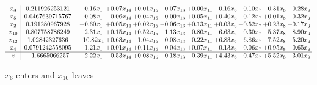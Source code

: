 \documentclass[9pt]{article}
\begin{document}
 \[\begin{array}{c| c c@{\hskip 2pt} c@{\hskip 2pt} c@{\hskip 2pt} c@{\hskip 2pt} c@{\hskip 2pt} c@{\hskip 2pt} c@{\hskip 2pt} c@{\hskip 2pt} c@{\hskip 2pt} }
 x_{3}   &  0.211926253121 & -0.16 x_{1} & +  0.07 x_{14} & +  0.01 x_{15} & +  0.07 x_{13} & +  0.00 x_{11} & -0.16 x_{6} & -0.10 x_{7} & -0.31 x_{8} & -0.28 x_{9}\\
 x_{5}   &  0.0467639715767 & -0.08 x_{1} & -0.06 x_{14} & +  0.04 x_{15} & +  0.00 x_{13} & +  0.05 x_{11} & +  0.40 x_{6} & -0.12 x_{7} & +  0.01 x_{8} & +  0.32 x_{9}\\
 x_{2}   &  0.191280967928 & +  0.60 x_{1} & +  0.05 x_{14} & +  0.02 x_{15} & -0.06 x_{13} & +  0.13 x_{11} & +  0.03 x_{6} & +  0.52 x_{7} & +  0.23 x_{8} & +  0.17 x_{9}\\
 x_{10}   &  0.807758786249 & -2.31 x_{1} & +  0.15 x_{14} & +  0.52 x_{15} & +  1.13 x_{13} & -0.80 x_{11} & -6.63 x_{6} & +  0.30 x_{7} & -5.37 x_{8} & +  8.90 x_{9}\\
 x_{12}   &  1.02842327636 & -10.82 x_{1} & +  0.63 x_{14} & -1.04 x_{15} & -0.08 x_{13} & -0.22 x_{11} & +  6.83 x_{6} & -6.86 x_{7} & -7.52 x_{8} & -5.20 x_{9}\\
 x_{4}   &  0.0791242558095 & +  1.21 x_{1} & +  0.01 x_{14} & +  0.11 x_{15} & -0.04 x_{13} & +  0.07 x_{11} & -0.13 x_{6} & +  0.06 x_{7} & +  0.95 x_{8} & +  0.65 x_{9}\\
\hline
z    &  -1.6665066257 & -2.22 x_{1} & -0.53 x_{14} & +  0.08 x_{15} & -0.18 x_{13} & -0.39 x_{11} & +  4.43 x_{6} & -0.47 x_{7} & +  5.52 x_{8} & -3.01 x_{9}\\
\end{array}\]


 $ x_{6} $ enters and $ x_{10} $ leaves 
\end{document}
